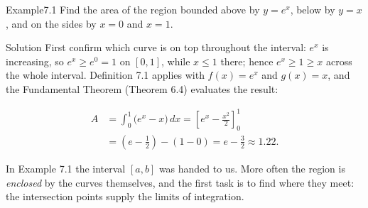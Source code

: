 \documentclass[a4paper,12pt,oneside]{memoir}
\begin{document}
\begin{workedexample}
\begin{envexample}{Example}{7.1}{}
Find the area of the region bounded above by \(y = e^{x}\), below by \(y = x\), and on the sides by \(x = 0\) and \(x = 1\).
\end{envexample}
\begin{envsolution}{Solution}{}{}
First confirm which curve is on top throughout the interval: \(e^{x}\) is increasing, so \(e^{x} \ge e^{0} = 1\) on \([0, 1]\), while \(x \le 1\) there; hence \(e^{x} \ge 1 \ge x\) across the whole interval. Definition 7.1 applies with \(f(x) = e^{x}\) and \(g(x) = x\), and the Fundamental Theorem (Theorem 6.4) evaluates the result:

\[ \begin{aligned}
          A &= \int_{0}^{1} \bigl(e^{x} - x\bigr)\,dx = \left[e^{x} - \frac{x^{2}}{2}\right]_{0}^{1} \\[2pt]
            &= \left(e - \frac{1}{2}\right) - (1 - 0) = e - \frac{3}{2} \approx 1.22.
        \end{aligned} \]\qedmark
\end{envsolution}
\end{workedexample}
In Example 7.1 the interval \([a, b]\) was handed to us. More often the region is \emph{enclosed} by the curves themselves, and the first task is to find where they meet: the intersection points supply the limits of integration.
\end{document}
